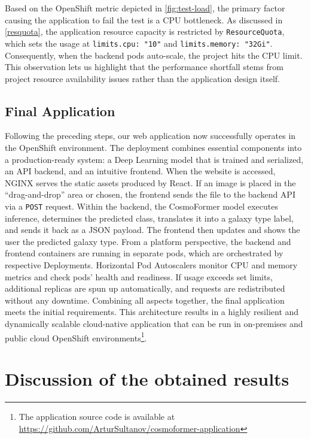 Based on the OpenShift metric depicted in \autoref{fig:test-load}, the primary factor causing the application to fail the test is a CPU bottleneck. As discussed in \autoref{resquota}, the application resource capacity is restricted by \texttt{ResourceQuota}, which sets the usage at \texttt{limits.cpu: "10"} and \texttt{limits.memory: "32Gi"}. Consequently, when the backend pods auto-scale, the project hits the CPU limit. This observation lets us highlight that the performance shortfall stems from project resource availability issues rather than the application design itself.

\section*{Final Application}

Following the preceding steps, our web application now successfully operates in the OpenShift environment. The deployment combines essential components into a production-ready system: a Deep Learning model that is trained and serialized, an API backend, and an intuitive frontend. When the website is accessed, NGINX serves the static assets produced by React. If an image is placed in the \enquote{drag-and-drop} area or chosen, the frontend sends the file to the backend API via a \texttt{POST} request. Within the backend, the CosmoFormer model executes inference, determines the predicted class, translates it into a galaxy type label, and sends it back as a JSON payload. The frontend then updates and shows the user the predicted galaxy type. From a platform perspective, the backend and frontend containers are running in separate pods, which are orchestrated by respective Deployments. Horizontal Pod Autoscalers monitor CPU and memory metrics and check pods' health and readiness. If usage exceeds set limits, additional replicas are spun up automatically, and requests are redistributed without any downtime. Combining all aspects together, the final application meets the initial requirements. This architecture results in a highly resilient and dynamically scalable cloud-native application that can be run in on-premises and public cloud OpenShift environments\footnote{The application source code is available at \url{https://github.com/ArturSultanov/cosmoformer-application}}.

\chapter{Discussion of the obtained results}

